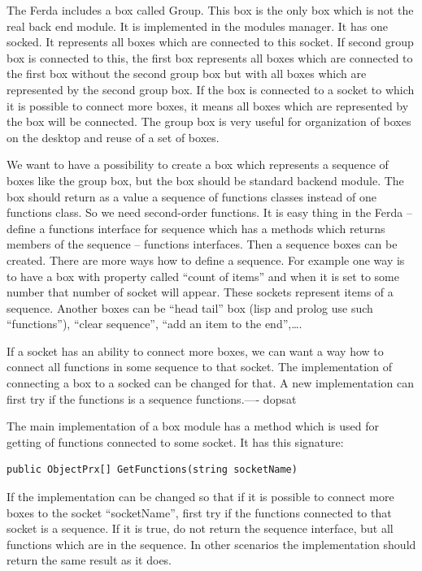 \documentclass[a4paper,12pt]{book}
\begin{document}
The Ferda includes a box called Group. This box is the only box which is not the real back end module. It is implemented in the modules manager. It has one socked. It represents all boxes which are connected to this socket. If second group box is connected to this, the first box represents all boxes which are connected to the first box without the second group box but with all boxes which are represented by the second group box. If the box is connected to a socket to which it is possible to connect more boxes, it means all boxes which are represented by the box will be connected. The group box is very useful for organization of boxes on the desktop and reuse of a set of boxes.

We want to have a possibility to create a box which represents a sequence of boxes like the group box, but the box should be standard backend module. The box should return as a value a sequence of functions classes instead of one functions class. So we need second-order functions. It is easy thing in the Ferda -- define a functions interface for sequence which has a methods which returns members of the sequence -- functions interfaces. Then a sequence boxes can be created. There are more ways how to define a sequence. For example one way is to have a box with property called ``count of items'' and when it is set to some number that number of socket will appear. These sockets represent items of a sequence. Another boxes can be ``head tail'' box (lisp and prolog use such ``functions''), ``clear sequence'',  ``add an item to the end'',\dots.

If a socket has an ability to connect more boxes, we can want a way how to connect all functions in some sequence to that socket. The implementation of connecting a box to a socked can be changed for that. A new implementation can first try if the functions is a sequence functions.---- dopsat

The main implementation of a box module has a method which is used for getting of functions connected to some socket. It has this signature:
\begin{verbatim}
public ObjectPrx[] GetFunctions(string socketName)
\end{verbatim}

If the implementation can be changed so that if it is possible to connect more boxes to the socket ``socketName'', first try if the functions connected to that socket is a sequence. If it is true, do not return the sequence interface, but all functions which are in the sequence. In other scenarios the implementation should return the same result as it does.
\end{document}
